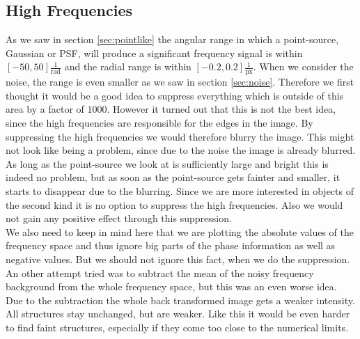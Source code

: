 \subsection{High Frequencies}
As we saw in section \ref{sec:pointlike} the angular range in which a point-source, Gaussian or PSF, will produce a significant frequency signal is within $[-50, 50] \frac{1}{\mathrm{rad}}$ and the radial range is within $[-0.2, 0.2] \frac{1}{\mathrm{px}}$. When we consider the noise, the range is even smaller as we saw in section \ref{sec:noise}.  
Therefore we first thought it would be a good idea to suppress everything which is outside of this area by a factor of $1000$. However it turned out that this is not the best idea, since the high frequencies are responsible for the edges in the image. By suppressing the high frequencies we would therefore blurry the image. This might not look like being a problem, since due to the noise the image is already blurred. As long as the point-source we look at is sufficiently large and bright this is indeed no problem, but as soon as the point-source gets fainter and smaller, it starts to disappear due to the blurring. Since we are more interested in objects of the second kind it is no option to suppress the high frequencies. Also we would not gain any positive effect through this suppression.\\
We also need to keep in mind here that we are plotting the absolute values of the frequency space and thus ignore big parts of the phase information as well as negative values. But we should not ignore this fact, when we do the suppression.\\
An other attempt tried was to subtract the mean of the noisy frequency background from the whole frequency space, but this was an even worse idea. Due to the subtraction the whole back transformed image gets a weaker intensity. All structures stay unchanged, but are weaker. Like this it would be even harder to find faint structures, especially if they come too close to the numerical limits. 

